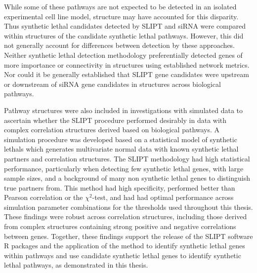 While some of these pathways are not expected to be detected in an isolated experimental cell line model,  structure may have accounted for this disparity. Thus \gls{synthetic lethal} candidates detected by \gls{SLIPT} and \gls{siRNA} were compared within  structures of the candidate \gls{synthetic lethal} pathways. However, this did not generally account for differences between detection by these approaches. Neither \gls{synthetic lethal} detection methodology preferentially detected genes of more importance or connectivity in  structures using established network metrics. Nor could it be generally established that \gls{SLIPT} gene candidates were upstream or downstream of \gls{siRNA} gene candidates in  structures across biological pathways.

Pathway  structures were also included in investigations with simulated data to ascertain whether the \gls{SLIPT} procedure performed desirably in data with complex correlation structures derived based on biological pathways. A simulation procedure was developed based on a statistical model of \glspl{synthetic lethal} which generates multivariate normal data with known \gls{synthetic lethal} partners and correlation structures. The \gls{SLIPT} methodology had high statistical performance, particularly when detecting few \gls{synthetic lethal} genes, with large sample sizes, and a background of many non \gls{synthetic lethal} genes to distinguish true partners from. This method had high specificity, performed better than Pearson correlation or the $\chi^2$-test, and had had optimal performance across simulation parameter combinations for the thresholds used throughout this thesis. These findings were robust across correlation structures, including those derived from complex  structures containing strong positive and negative correlations between genes. 
Together, these findings support the release of the \gls{SLIPT} software R packages and the application of the method to identify \gls{synthetic lethal} genes within pathways and use candidate \gls{synthetic lethal} genes to identify \gls{synthetic lethal} pathways, as demonstrated in this thesis.



